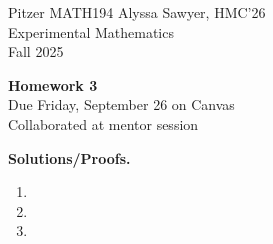 \documentclass[12pt]{article}
\begin{document}
Pitzer MATH194 \hfill Alyssa Sawyer, HMC'26  
\\
Experimental Mathematics \hfill  \\
Fall 2025
\begin{center}
{\large \bf Homework 3}\\
Due Friday, September 26 on Canvas \\ 
Collaborated at mentor session
\end{center}

{\bf Solutions/Proofs.}
\begin{enumerate}

\item

\newpage
\item 


\newpage
\item




\end{enumerate}
\end{document}
